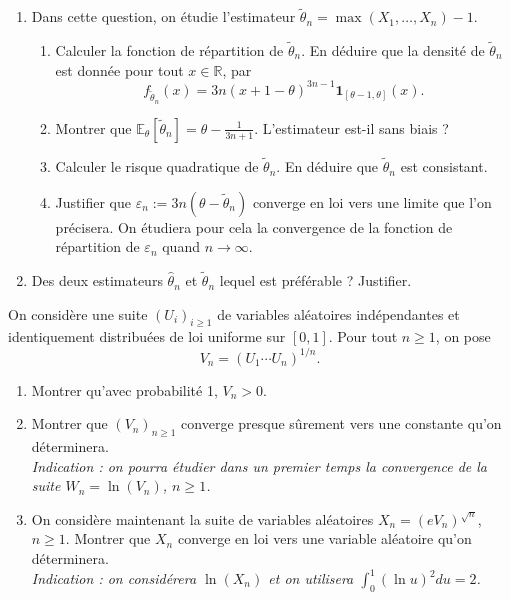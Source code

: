 \begin{mdframed}
\begin{exercice}
\begin{enumerate}
    \item Dans cette question, on étudie l'estimateur $\tilde{\theta}_n = \max(X_1, \dots, X_n) - 1$.
    \begin{enumerate}
        \item[i--] Calculer la fonction de répartition de $\tilde{\theta}_n$. En déduire que la densité de $\tilde{\theta}_n$ est donnée pour tout $x \in \mathbb{R}$, par
        \begin{equation*}
        f_{\tilde{\theta}_n}(x) = 3n(x + 1 - \theta)^{3n-1} \mathbf{1}_{[\theta-1, \theta]} (x).
        \end{equation*}
        \item[ii--] Montrer que $\mathbb{E}_\theta[\tilde{\theta}_n] = \theta - \frac{1}{3n+1}$. L'estimateur est-il sans biais ?
        \item[iii--] Calculer le risque quadratique de $\tilde{\theta}_n$. En déduire que $\tilde{\theta}_n$ est consistant.
        \item[iv--] Justifier que $\varepsilon_n := 3n(\theta - \tilde{\theta}_n)$ converge en loi vers une limite que l'on précisera. On étudiera pour cela la convergence de la fonction de répartition de $\varepsilon_n$ quand $n \to \infty$.
    \end{enumerate}
    \item Des deux estimateurs $\hat{\theta}_n$ et $\tilde{\theta}_n$ lequel est préférable ? Justifier.
\end{enumerate}
\end{exercice}
\end{mdframed}

\smallskip

\begin{mdframed}
\begin{exercice}
On considère une suite $(U_i)_{i \ge 1}$ de variables aléatoires indépendantes et identiquement distribuées de loi uniforme sur $[0, 1]$. Pour tout $n \ge 1$, on pose
\begin{equation*}
V_n = (U_1 \cdots U_n)^{1/n}.
\end{equation*}

\begin{enumerate}
    \item Montrer qu'avec probabilité 1, $V_n > 0$.
    \item Montrer que $(V_n)_{n \ge 1}$ converge presque sûrement vers une constante qu'on déterminera.\\
    \textit{Indication : on pourra étudier dans un premier temps la convergence de la suite $W_n = \ln(V_n)$, $n \ge 1$.}
    \item On considère maintenant la suite de variables aléatoires $X_n = (e V_n)^{\sqrt{n}}$, $n \ge 1$. Montrer que $X_n$ converge en loi vers une variable aléatoire qu'on déterminera.\\
    \textit{Indication : on considérera $\ln(X_n)$ et on utilisera $\int_0^1 (\ln u)^2 du = 2$.}
\end{enumerate}
\end{exercice}
\end{mdframed}

